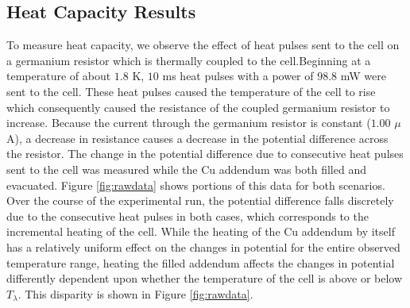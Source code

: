 \subsection{Heat Capacity Results}\label{heatcapacityresults}

To measure heat capacity, we observe the effect of heat pulses sent to the cell on a germanium resistor which is thermally coupled to the cell.Beginning at a temperature of about $1.8$ K, $10$ ms heat pulses with a power of $98.8$ mW were sent to the cell.  These heat pulses caused the temperature of the cell to rise which consequently caused the resistance of the coupled germanium resistor to increase.  Because the current through the germanium resistor is constant ($1.00$ $\mu$A), a decrease in resistance causes a decrease in the potential difference across the resistor. The change in the potential difference due to consecutive heat pulses sent to the cell was measured while the Cu addendum was both filled and evacuated.  Figure \ref{fig:rawdata} shows portions of this data for both scenarios.  Over the course of the experimental run, the potential difference falls discretely due to the consecutive heat pulses in both cases, which corresponds to the incremental heating of the cell. While the heating of the Cu addendum by itself has a relatively uniform effect on the changes in potential for the entire observed temperature range, heating the filled addendum affects the changes in potential differently dependent upon whether the temperature of the cell is above or below $T_{\lambda}$.  This disparity is shown in Figure \ref{fig:rawdata}. 

